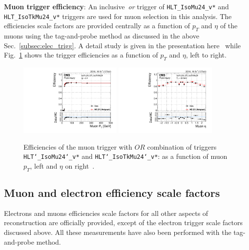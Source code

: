 \noindent \textbf{Muon trigger efficiency}: An inclusive~\textit{or} trigger of \texttt{HLT\_IsoMu24\_v*} and \texttt{HLT\_IsoTkMu24\_v*} triggers are used for muon selection in this analysis. The efficiencies scale factors are provided centrally as a function of $p_T$ and $\eta$ of the muons using the tag-and-probe method as discussed in the above Sec.~\ref{subsec:elec_trigg}. A detail study is given in the presentation here~\cite{wiki:muon_trigger} while Fig.~\ref{Fig:muon_trigg_eff} shows the trigger efficiencies as a function of $p_T$ and $\eta$, left to right.
\begin{figure}
  \centering
  \includegraphics[width=0.45\textwidth]{fig/chapt7/trigger_eff/Total_IsoTkMu24_pt}
  \includegraphics[width=0.45\textwidth]{fig/chapt7/trigger_eff/Total_IsoTkMu24_eta}
  \caption{Efficiencies of the muon trigger with $OR$ combination of triggers \texttt{HLT\char`_IsoMu24\char`_v*} and \texttt{HLT\char`_IsoTkMu24\char`_v*}: as a function of muon $p_T$, left and $\eta$ on right~\cite{wiki:muon_trigg_eff}.}
  \label{Fig:muon_trigg_eff}
\end{figure}  
\subsection{Muon and electron efficiency scale factors}
\label{Sec:LeptonSF}
%
Electrons and muons efficiencies scale factors for all other aspects of reconstruction are officially provided, except of the electron trigger scale factors discussed above.
All these measurements have also been performed with the tag-and-probe method.

